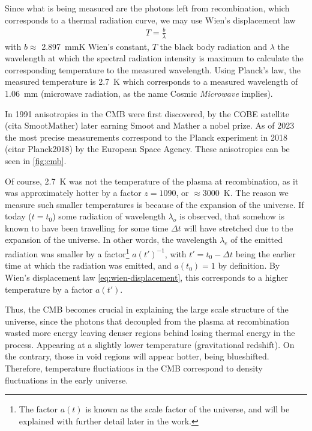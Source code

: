 Since what is being measured are the photons left from recombination, which corresponds to a thermal radiation curve, we may use Wien's displacement law 
\begin{align}
	T = \frac{b}{\lambda}
	\label{eq:wien-displacement}
\end{align}
with $b\approx $ \SI{2.897}{mmK} Wien's constant, $T$ the black body radiation and $\lambda$ the wavelength at which the spectral radiation intensity is maximum to calculate the corresponding temperature to the measured wavelength. Using Planck's law, the measured temperature is \SI{2.7}{K} which corresponds to a measured wavelength of \SI{1.06}{mm} (microwave radiation, as the name Cosmic \textit{Microwave} implies).

In 1991 anisotropies in the CMB were first discovered, by the COBE satellite (cita SmootMather) later earning Smoot and Mather a nobel prize. As of 2023 the most precise measurements correspond to the Planck experiment in 2018 (citar Planck2018) by the European Space Agency. These anisotropies can be seen in \ref{fig:cmb}.

Of course, \SI{2.7}{K} was not the temperature of the plasma at recombination, as it was approximately hotter by a factor $z=1090$, or $\approx$\SI{3000}{K}. The reason we measure such smaller temperatures is because of the expansion of the universe.
If today ($t=t_0$) some radiation of wavelength $\lambda_o$ is observed, that somehow is known to have been travelling for some time $\Delta t$ will have stretched due to the expansion of the universe. In other words, the wavelength $\lambda_e$ of the emitted radiation was smaller by a factor\footnote{The factor $a(t)$ is known as the scale factor of the universe, and will be explained with further detail later in the work.} $a(t')^{-1}$, with $t' = t_0-\Delta t$ being the earlier time at which the radiation was emitted, and $a(t_0)=1$ by definition. By Wien's displacement law \eqref{eq:wien-displacement}, this corresponds to a higher temperature by a factor $a(t')$.


Thus, the CMB becomes crucial in explaining the large scale structure of the universe, since the photons that decoupled from the plasma at recombination wasted more energy leaving denser regions behind losing thermal energy in the process. Appearing at a slightly lower temperature (gravitational redshift). On the contrary, those in void regions will appear hotter, being blueshifted. Therefore, temperature fluctiations in the CMB correspond to density fluctuations in the early universe.


